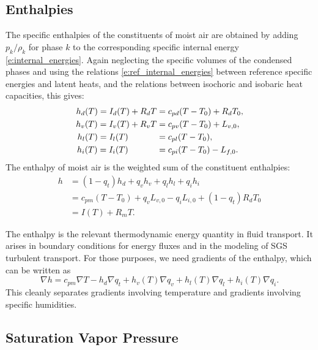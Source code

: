 \documentclass{report}
\begin{document}
\subsection{Enthalpies}\label{s:enthalpies}

The specific enthalpies of the constituents of moist air are obtained by adding $p_k/\rho_k$ for phase $k$ to the corresponding specific internal energy \eqref{e:internal_energies}. Again neglecting the specific volumes of the condensed phases and using the relations \eqref{e:ref_internal_energies} between reference specific energies and latent heats, and the relations between isochoric and isobaric heat capacities, this gives:
\begin{subequations}
\begin{align}
    h_d(T) = I_d(T) + R_d T &= c_{pd}(T-T_0) + R_d T_0, \\
    h_v(T) = I_v(T) + R_v T &= c_{pv}(T-T_0) + L_{v,0}, \\
    h_l(T) = I_l(T) \hphantom{{\,}+ R_d T} &= c_{pl}(T-T_0), \\
    h_i(T) = I_i(T) \hphantom{{\,}+ R_d T} &= c_{pi}(T-T_0) - L_{f,0}.
\end{align}
\end{subequations}
The enthalpy of moist air is the weighted sum of the constituent enthalpies:
\begin{equation}
\begin{split}
    h   &= (1-q_t) h_d + q_v h_v + q_l h_l + q_i h_i \\
        &= c_{pm} (T-T_0) + q_v L_{v,0} - q_i L_{i,0} + (1-q_t) R_d T_0\\
        &= I(T) + R_m T.
\end{split}
\end{equation}

The enthalpy is the relevant thermodynamic energy quantity in fluid transport. It arises in boundary conditions for energy fluxes and in the modeling of SGS turbulent transport. For those purposes, we need gradients of the enthalpy, which can be written as 
\begin{equation}\label{e:enthalpy_gradient}
    \nabla h = c_{pm} \nabla T - h_d \nabla q_t
    + h_v(T) \nabla q_v + h_l(T) \nabla q_l + h_i(T) \nabla q_i.
\end{equation}
This cleanly separates gradients involving temperature and gradients involving specific humidities.

\subsection{Saturation Vapor Pressure}
\end{document}
